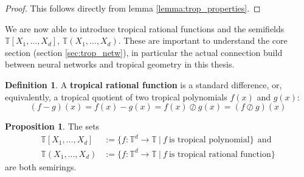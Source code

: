\documentclass{article}
\theoremstyle{definition}
\newtheorem{definition}[theorem]{Definition}
\newtheorem{proposition}[theorem]{Proposition}
\begin{document}
\begin{proof}
This follows directly from lemma \ref{lemma:trop_properties}.
\end{proof}

We are now able to introduce tropical rational functions and the semifields $\mathbb{T}[X_{1} , \dots , X_{d}]$, $\mathbb{T}(X_{1} , \dots , X_{d})$. These are important to understand the core section (section \ref{sec:trop_netw}), in particular the actual connection build between neural networks and tropical geometry in this thesis.

\begin{definition}\hspace{1sp}\cite[p.~3]{zhang2018tropical}
A \textbf{tropical rational function} is a standard difference, or, equivalently, a tropical quotient of two tropical polynomials $f(x)$ and $g(x)$:
$$ (f-g)(x) = f(x) - g(x) = f(x) \oslash g(x) = (f \oslash g)(x)$$
\end{definition}
\begin{proposition}\hspace{1sp}\cite[p.~3]{zhang2018tropical}\label{prop:trop_semi_ring_set}
The sets 
\begin{align*}
\mathbb{T}[X_1, \dots , X_d] &:= \{ f: \mathbb{T}^{d} \to \mathbb{T} \ | \ f \ \text{is tropical polynomial} \} \ \ \text{and} \\ 
\mathbb{T}(X_1, \dots , X_d) &:= \{ f: \mathbb{T}^{d} \to \mathbb{T} \ | \ f \ \text{is tropical rational function} \}
\end{align*}
 are both semirings.
\end{proposition}
\end{document}
